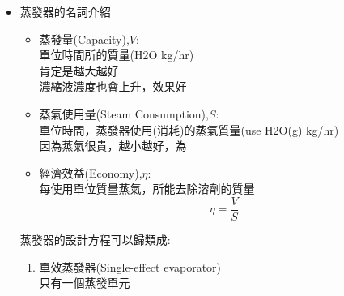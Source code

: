 \documentclass[../main.tex]{subfiles}
\begin{document}
\begin{itemize}
\begin{enumerate}
\begin{itemize}
      \item 由於氣液飛濺的情形嚴重、泵浦的動力消耗、成本較高
    \end{itemize}
    \item 夾套式蒸發器(攪膜蒸發器)
    \begin{itemize}
      \item 唯一一種不會有水垢的問題
      \item 中央有一個旋轉刮刀，會把進料物流全部撥到牆面，形成薄膜向下流
      \item 垢雖會生成於牆面，但不會妨礙蒸氣的熱傳
      \item 適用於易結垢、高黏度、對溫度敏感的流體
      \item 成本高、操作困難
    \end{itemize}
  \end{enumerate}
  \item 蒸發器的名詞介紹
  \begin{itemize}
    \item 蒸發量(Capacity),$V$:\\
    單位時間所的質量(H2O kg/hr)\\
    肯定是越大越好\\
    濃縮液濃度也會上升，效果好
    \item 蒸氣使用量(Steam Consumption),$S$:\\
    單位時間，蒸發器使用(消耗)的蒸氣質量(use H2O(g) kg/hr)\\
    因為蒸氣很貴，越小越好，為
    \item 經濟效益(Economy),$\eta$:\\
    每使用單位質量蒸氣，所能去除溶劑的質量
    \begin{equation}
      \eta = \frac{V}{S}
    \end{equation}
  \end{itemize}
  蒸發器的設計方程可以歸類成:
  \begin{enumerate}
    \item 單效蒸發器(Single-effect evaporator)\\
      只有一個蒸發單元
      \begin{figure}[H]
      \centering
\end{figure}
\end{enumerate}
\end{itemize}
\end{document}
